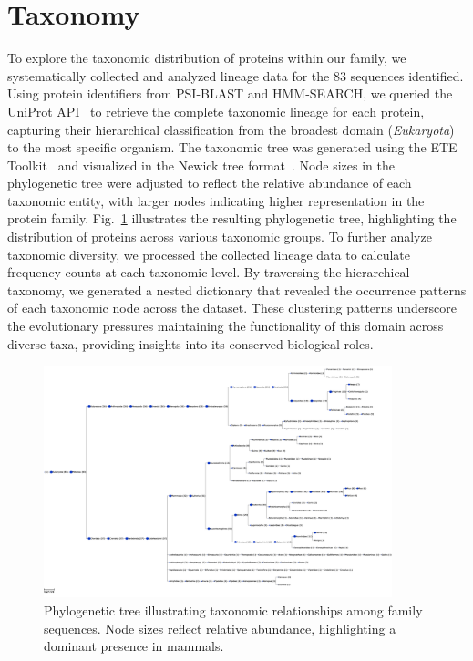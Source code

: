 
\section{Taxonomy}

To explore the taxonomic distribution of proteins within our family, we systematically collected and analyzed lineage data for the $83$ sequences identified. Using protein identifiers from PSI-BLAST and HMM-SEARCH, we queried the UniProt API~\cite{uniprot_api} to retrieve the complete taxonomic lineage for each protein, capturing their hierarchical classification from the broadest domain (\textit{Eukaryota}) to the most specific organism. The taxonomic tree was generated using the ETE Toolkit~\cite{ete_toolkit} and visualized in the Newick tree format~\cite{newick_format}. Node sizes in the phylogenetic tree were adjusted to reflect the relative abundance of each taxonomic entity, with larger nodes indicating higher representation in the protein family. Fig.~\ref{fig:phylo-tree} illustrates the resulting phylogenetic tree, highlighting the distribution of proteins across various taxonomic groups. To further analyze taxonomic diversity, we processed the collected lineage data to calculate frequency counts at each taxonomic level. By traversing the hierarchical taxonomy, we generated a nested dictionary that revealed the occurrence patterns of each taxonomic node across the dataset. These clustering patterns underscore the evolutionary pressures maintaining the functionality of this domain across diverse taxa, providing insights into its conserved biological roles.

\begin{figure}[h!]
    \centering
    \includegraphics[width=0.9\textwidth]{images/phylogenetic_tree_freq.png}
    \caption{Phylogenetic tree illustrating taxonomic relationships among family sequences. Node sizes reflect relative abundance, highlighting a dominant presence in mammals.}
    \label{fig:phylo-tree}
\end{figure}
